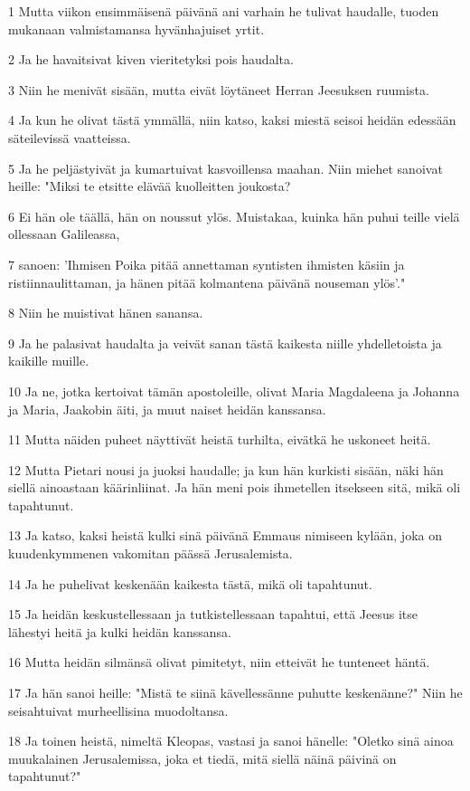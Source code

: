 \par 1 Mutta viikon ensimmäisenä päivänä ani varhain he tulivat haudalle, tuoden mukanaan valmistamansa hyvänhajuiset yrtit.
\par 2 Ja he havaitsivat kiven vieritetyksi pois haudalta.
\par 3 Niin he menivät sisään, mutta eivät löytäneet Herran Jeesuksen ruumista.
\par 4 Ja kun he olivat tästä ymmällä, niin katso, kaksi miestä seisoi heidän edessään säteilevissä vaatteissa.
\par 5 Ja he peljästyivät ja kumartuivat kasvoillensa maahan. Niin miehet sanoivat heille: "Miksi te etsitte elävää kuolleitten joukosta?
\par 6 Ei hän ole täällä, hän on noussut ylös. Muistakaa, kuinka hän puhui teille vielä ollessaan Galileassa,
\par 7 sanoen: 'Ihmisen Poika pitää annettaman syntisten ihmisten käsiin ja ristiinnaulittaman, ja hänen pitää kolmantena päivänä nouseman ylös'."
\par 8 Niin he muistivat hänen sanansa.
\par 9 Ja he palasivat haudalta ja veivät sanan tästä kaikesta niille yhdelletoista ja kaikille muille.
\par 10 Ja ne, jotka kertoivat tämän apostoleille, olivat Maria Magdaleena ja Johanna ja Maria, Jaakobin äiti, ja muut naiset heidän kanssansa.
\par 11 Mutta näiden puheet näyttivät heistä turhilta, eivätkä he uskoneet heitä.
\par 12 Mutta Pietari nousi ja juoksi haudalle; ja kun hän kurkisti sisään, näki hän siellä ainoastaan käärinliinat. Ja hän meni pois ihmetellen itsekseen sitä, mikä oli tapahtunut.
\par 13 Ja katso, kaksi heistä kulki sinä päivänä Emmaus nimiseen kylään, joka on kuudenkymmenen vakomitan päässä Jerusalemista.
\par 14 Ja he puhelivat keskenään kaikesta tästä, mikä oli tapahtunut.
\par 15 Ja heidän keskustellessaan ja tutkistellessaan tapahtui, että Jeesus itse lähestyi heitä ja kulki heidän kanssansa.
\par 16 Mutta heidän silmänsä olivat pimitetyt, niin etteivät he tunteneet häntä.
\par 17 Ja hän sanoi heille: "Mistä te siinä kävellessänne puhutte keskenänne?" Niin he seisahtuivat murheellisina muodoltansa.
\par 18 Ja toinen heistä, nimeltä Kleopas, vastasi ja sanoi hänelle: "Oletko sinä ainoa muukalainen Jerusalemissa, joka et tiedä, mitä siellä näinä päivinä on tapahtunut?"
